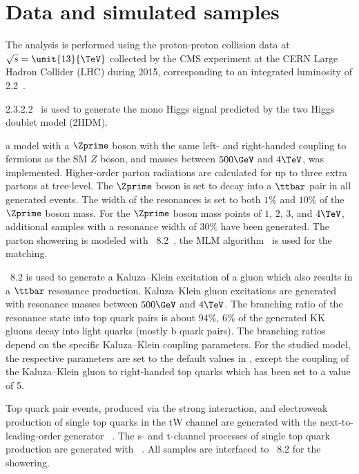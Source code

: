 \section{Data and simulated samples}

The analysis is performed using the proton-proton collision data at 
$\sqrt{s} = \unit{13}{\TeV}$ collected by the CMS experiment at the CERN 
Large Hadron Collider (LHC) during 2015, corresponding to an integrated 
luminosity of 2.2~\fbinv. 

 2.3.2.2~\cite{bib:MADGRAPH} is used to generate the mono Higgs 
signal predicted by the two Higgs doublet model (2HDM).

a model with a $\Zprime$ boson with
the same left- and right-handed coupling to fermions as the SM $Z$ boson,
and masses between $500\GeV$ and $4\TeV$, was implemented.
Higher-order parton radiations are calculated 
for up to three extra partons at tree-level.
The $\Zprime$ boson is set to decay into
a $\ttbar$ pair in all generated events.
The width of the resonances is set to
both $1\%$ and $10\%$ of the $\Zprime$ boson mass.
For the $\Zprime$ boson mass points of $1$, $2$, $3$, and $4\TeV$,
additional samples with a resonance width of $30\%$ have been generated.
The parton showering is modeled with \PYTHIA~8.2~\cite{Sjostrand:2006za,Sjostrand:2014zea},
the MLM algorithm~\cite{mlm} is used for the matching. 

\PYTHIA~8.2 is used to generate a
Kaluza--Klein excitation of a gluon
which also results in a $\ttbar$ resonance production. 
Kaluza--Klein gluon excitations are generated with resonance masses between $500\GeV$ and $4\TeV$.
The branching ratio of the resonance state into top quark pairs is about $94\%$,
$6\%$ of the generated KK gluons decay into light quarks (mostly b quark pairs).
The branching ratios depend on the specific Kaluza--Klein coupling parameters. 
For the studied model, the respective \PYTHIA parameters are set to
the default values in \PYTHIA,
except the coupling of the Kaluza--Klein gluon
to right-handed top quarks which has been set to a value of 5.

Top quark pair events, produced via the strong interaction,
and electroweak production of single top quarks in the tW channel
are generated with the next-to-leading-order generator
\POWHEG~\cite{Nason:2004rx,Frixione:2007vw,Alioli:2010xd,Frixione:2007nw,Re:2010bp}.
The s- and t-channel processes of single top quark production
are generated with \aMCATNLO~\cite{Alwall:2014hca}.
All samples are interfaced to \PYTHIA~8.2 for the showering. 

